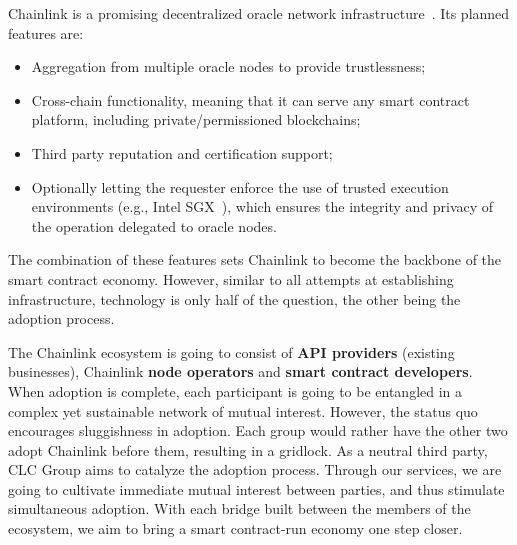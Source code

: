 \documentclass[12pt]{article}
\begin{document}
Chainlink is a promising decentralized oracle network infrastructure~\cite{Ellis:2017}. Its planned features are:
\begin{itemize}
	\item Aggregation from multiple oracle nodes to provide trustlessness;
	\item Cross-chain functionality, meaning that it can serve any smart contract platform, including private/permissioned blockchains;
	\item Third party reputation and certification support;
	\item Optionally letting the requester enforce the use of trusted execution environments (e.g., Intel SGX~\cite{Costan:2016}), which ensures the integrity and privacy of the operation delegated to oracle nodes.
\end{itemize}
The combination of these features sets Chainlink to become the backbone of the smart contract economy.
However, similar to all attempts at establishing infrastructure, technology is only half of the question, the other being the adoption process.

The Chainlink ecosystem is going to consist of \textbf{API providers} (existing businesses), Chainlink \textbf{node operators} and \textbf{smart contract developers}.
When adoption is complete, each participant is going to be entangled in a complex yet sustainable network of mutual interest.
However, the status quo encourages sluggishness in adoption. Each group would rather have the other two adopt Chainlink before them, resulting in a gridlock.
As a neutral third party, CLC Group aims to catalyze the adoption process.
Through our services, we are going to cultivate immediate mutual interest between parties, and thus stimulate simultaneous adoption.
With each bridge built between the members of the ecosystem, we aim to bring a smart contract-run economy one step closer.
\end{document}
